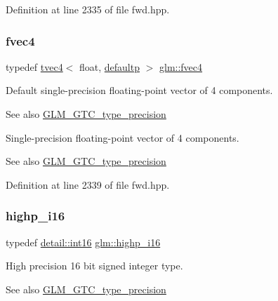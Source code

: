 Definition at line 2335 of file fwd.\+hpp.

\mbox{\label{group__gtc__type__precision_ga396c4084cd7e5465f8b56035e0420c3e}} 
\subsubsection{\texorpdfstring{fvec4}{fvec4}}
{\footnotesize\ttfamily typedef \mbox{\hyperlink{structglm_1_1tvec4}{tvec4}}$<$ float, \mbox{\hyperlink{namespaceglm_a0f04f086094c747d227af4425893f545a9d21ccd8b5a009ec7eb7677befc3bf51}{defaultp}} $>$ \mbox{\hyperlink{group__gtc__type__precision_ga396c4084cd7e5465f8b56035e0420c3e}{glm\+::fvec4}}}

Default single-\/precision floating-\/point vector of 4 components. \begin{DoxySeeAlso}{See also}
\mbox{\hyperlink{group__gtc__type__precision}{G\+L\+M\+\_\+\+G\+T\+C\+\_\+type\+\_\+precision}}
\end{DoxySeeAlso}
Single-\/precision floating-\/point vector of 4 components. \begin{DoxySeeAlso}{See also}
\mbox{\hyperlink{group__gtc__type__precision}{G\+L\+M\+\_\+\+G\+T\+C\+\_\+type\+\_\+precision}} 
\end{DoxySeeAlso}


Definition at line 2339 of file fwd.\+hpp.

\mbox{\label{group__gtc__type__precision_gaa04399853952dbce29cb62e2432f350a}} 
\subsubsection{\texorpdfstring{highp\_i16}{highp\_i16}}
{\footnotesize\ttfamily typedef \mbox{\hyperlink{namespaceglm_1_1detail_a375938874ca4f0a0982ec6373b56117b}{detail\+::int16}} \mbox{\hyperlink{group__gtc__type__precision_gaa04399853952dbce29cb62e2432f350a}{glm\+::highp\+\_\+i16}}}

High precision 16 bit signed integer type. \begin{DoxySeeAlso}{See also}
\mbox{\hyperlink{group__gtc__type__precision}{G\+L\+M\+\_\+\+G\+T\+C\+\_\+type\+\_\+precision}} 
\end{DoxySeeAlso}


